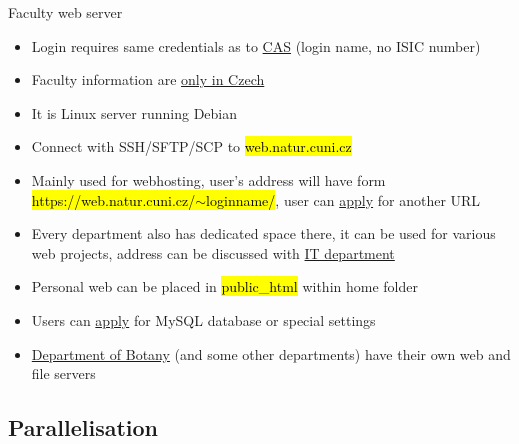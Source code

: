 \documentclass[compress, ucs, xelatex, 11pt, xcolor=svgnames,
  hyperref={
    bookmarks=true,
    unicode=true,
    colorlinks=true,
    pdftitle={Linux, command line and MetaCentrum},
    plainpages=false,
    pdfauthor={Vojtech Zeisek},
    pdfsubject={Course about use of Linux command line, writing shell scripts and using MetaCentrum of CESNET},
    pdfcreator={XeLaTeX},
    pdfkeywords={Linux, GNU, BASH, shell, command line, MetaCentrum},
    linkcolor=DarkRed,
    anchorcolor=DarkBlue,
    citecolor=Indigo,
    filecolor=NavyBlue,
    menucolor=DarkMagenta,
    urlcolor=DarkBlue,
    pdftex},
  url={hyphens, lowtilde} %
  ]{beamer}
\renewcommand{\texttt}[1]{\hl{\ttfamily #1}}
\begin{document}
\begin{frame}{Faculty web server}
  \begin{itemize}
    \item Login requires same credentials as to \href{https://cas.cuni.cz/}{CAS} (login name, no ISIC number)
    \item Faculty information are \href{https://www.natur.cuni.cz/fakulta/cit/web-aplikace/webhosting}{only in Czech}
    \item It is Linux server running Debian
    \item Connect with SSH/SFTP/SCP to \texttt{web.natur.cuni.cz}
    \item Mainly used for webhosting, user's address will have form \texttt{https://web.natur.cuni.cz/$\sim$loginname/}, user can \href{https://helpdesk.natur.cuni.cz/servlet/HelpdeskDynamic?eid=Rozcestnik}{apply} for another URL
    \item Every department also has dedicated space there, it can be used for various web projects, address can be discussed with \href{https://www.natur.cuni.cz/fakulta/cit/lide}{IT department}
    \item Personal web can be placed in \texttt{public\_html} within home folder
    \item Users can \href{https://helpdesk.natur.cuni.cz/servlet/HelpdeskDynamic?eid=Rozcestnik}{apply} for MySQL database or special settings
    \item \href{https://www.natur.cuni.cz/biology/botany/working-information/servers-webs-computers/}{Department of Botany} (and some other departments) have their own web and file servers
  \end{itemize}
\end{frame}

\subsection{Parallelisation}
\end{document}
